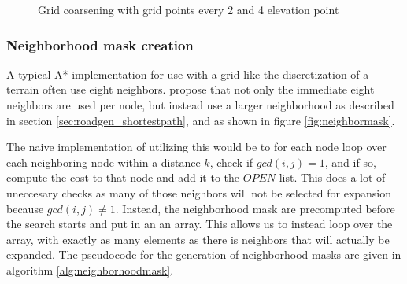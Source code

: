 \begin{figure}[ht]
\centering
{}
\qquad
{}
\caption{Grid coarsening with grid points every 2 and 4 elevation point}
\label{fig:grid_coarsening}
\end{figure}

\subsubsection{Neighborhood mask creation}
A typical A* implementation for use with a grid like the discretization of a terrain often use eight neighbors. \cite{roadgen} propose that not only the immediate eight neighbors are used per node, but instead use a larger neighborhood as described in section \ref{sec:roadgen_shortestpath}, and as shown in figure \ref{fig:neighbormask}. 

The naive implementation of utilizing this would be to for each node loop over each neighboring node within a distance $k$, check if $gcd(i,j)=1$, and if so, compute the cost to that node and add it to the $OPEN$ list. This does a lot of uneccesary checks as many of those neighbors will not be selected for expansion because $gcd(i,j)\neq 1$. Instead, the neighborhood mask are precomputed before the search starts and put in an an array. This allows us to instead loop over the array, with exactly as many elements as there is neighbors that will actually be expanded. The pseudocode for the generation of neighborhood masks are given in algorithm \ref{alg:neighborhoodmask}.

